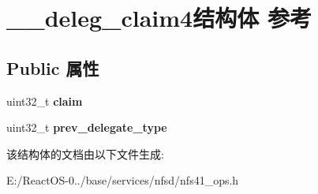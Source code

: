 \hypertarget{struct____deleg__claim4}{}\section{\+\_\+\+\_\+deleg\+\_\+claim4结构体 参考}
\label{struct____deleg__claim4}
\subsection*{Public 属性}
\begin{DoxyCompactItemize}
\item 
\mbox{\label{struct____deleg__claim4_a2ebc1908ac042a22e6cc6c3ffb7f433e}} 
uint32\+\_\+t {\bfseries claim}
\item 
\mbox{\label{struct____deleg__claim4_ad642d38ce869cf834af06c0583904735}} 
uint32\+\_\+t {\bfseries prev\+\_\+delegate\+\_\+type}
\end{DoxyCompactItemize}


该结构体的文档由以下文件生成\+:\begin{DoxyCompactItemize}
\item 
E\+:/\+React\+O\+S-\/0../base/services/nfsd/nfs41\+\_\+ops.\+h\end{DoxyCompactItemize}
